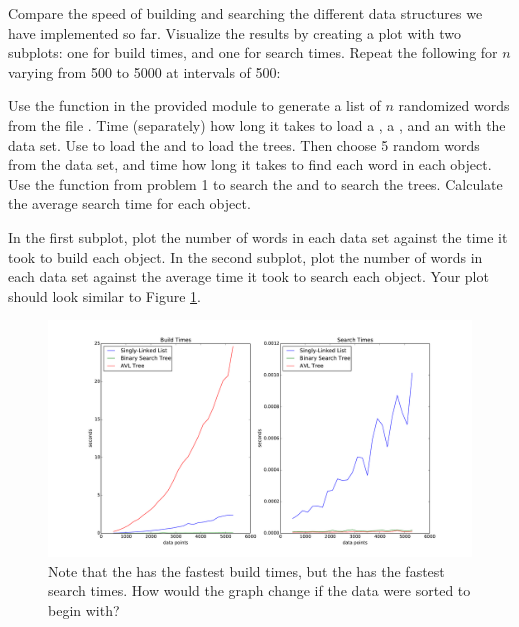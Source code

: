 \begin{problem}
Compare the speed of building and searching the different data structures we have implemented so far.
Visualize the results by creating a plot with two subplots: one for build times, and one for search times.
Repeat the following for $n$ varying from 500 to 5000 at intervals of 500:

Use the  function in the provided  module to generate a list of $n$ randomized words from the file .
Time (separately) how long it takes to load a , a , and an  with the data set.
Use  to load the  and  to load the trees.
Then choose 5 random words from the data set, and time how long it takes to find each word in each object.
Use the  function from problem 1 to search the  and  to search the trees.
Calculate the average search time for each object.

In the first subplot, plot the number of words in each data set against the time it took to build each object.
In the second subplot, plot the number of words in each data set against the average time it took to search each object.
Your plot should look similar to Figure \ref{fig:times}.

\begin{figure}[H]
\includegraphics[width=\textwidth]{times.pdf}
\caption{Note that the  has the fastest build times, but the  has the fastest search times. How would the graph change if the data were sorted to begin with?}
\label{fig:times}
\end{figure}

\end{problem}

